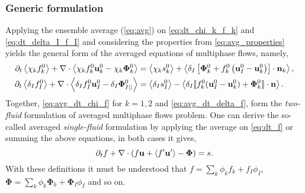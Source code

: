 \subsubsection{Generic formulation}
Applying the ensemble average (\ref{eq:avg}) on \ref{eq:dt_chi_k_f_k} and \ref{eq:dt_delta_I_f_I} and considering the properties from \ref{eq:avg_properties} yields the general form of the averaged equations of multiphase flows, namely,
\begin{align}
    \partial_t \left<\chi_k f_k^0\right>
    +\mathbf{\nabla}\cdot \left<\chi_k f_k^0 \textbf{u}_k^0 - \chi_k \mathbf{\Phi}_k^0\right>
    &= 
    \left<\chi_k s_k^0\right>
    + \left<\delta_I\left[
        \mathbf{\Phi}_k^0
        + f_k^0
        \left(
            \textbf{u}_I^0
            - \textbf{u}_k^0
        \right)
    \right]
    \cdot \textbf{n}_k\right> ,
    \label{eq:avg_dt_chi_f}\\
    \partial_t \left<\delta_If_I^0\right>
    +\mathbf{\nabla}\cdot \left<\delta_I f_I^0 \textbf{u}_I^0-\delta_I \mathbf{\Phi}_{I||}^0 \right>
    &= 
    \left<\delta_Is_I^0\right> 
    - \left<\delta_I \llbracket 
    f_k^0 (\textbf{u}_I^0 - \textbf{u}_k^0)
    + \mathbf{\Phi}_k^0
     \rrbracket \cdot \textbf{n} \right>.
    \label{eq:avg_dt_delta_f}
\end{align}
Together, \ref{eq:avg_dt_chi_f} for $k=1,2$  and \ref{eq:avg_dt_delta_f}, form the \textit{two-fluid} formulation of averaged multiphase flows problem. 
One can derive the so-called averaged \textit{single-fluid} formulation by applying the average on \ref{eq:dt_f} or summing the above equations, in both cases it gives, 
\begin{equation}
    \partial_t f
    + \mathbf{\nabla}\cdot (f \textbf{u} + \left<f'\textbf{u}'\right> - \mathbf{\Phi})
    = 
    s.
    \label{eq:avg_dt_f}
\end{equation}
With these definitions it must be understood that $f = \sum_k \phi_k f_k + f_I \phi_I$, $\bm\Phi = \sum_k \phi_k \bm\Phi_k + \bm\Phi_I \phi_I$ and so on. 


